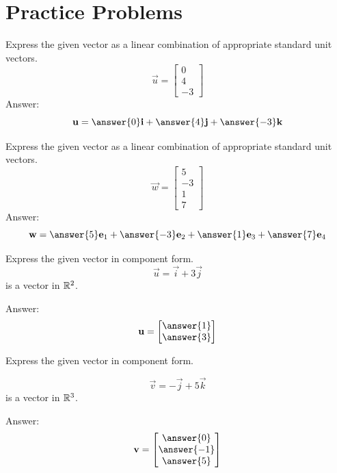 \documentclass{ximera}
\begin{document}
\section*{Practice Problems}
\begin{problem}\label{prob:lincombijk1a}
  Express the given vector as a linear combination of appropriate standard unit vectors.
  $$\vec{u}=\begin{bmatrix}
0\\
4\\
-3
\end{bmatrix}$$
Answer:
$$\vec{u}=\answer{0}\vec{i}+\answer{4}\vec{j}+\answer{-3}\vec{k}$$
\end{problem}

\begin{problem}\label{prob:lincombijk1c}
Express the given vector as a linear combination of appropriate standard unit vectors.
$$\vec{w}=\begin{bmatrix}
5\\
-3\\
1\\
7
\end{bmatrix}$$
Answer:
$$\vec{w}=\answer{5}\vec{e}_1+\answer{-3}\vec{e}_2+\answer{1}\vec{e}_3+\answer{7}\vec{e}_4$$
  \end{problem}



  \begin{problem}\label{prob:lincombijk2a}
  Express the given vector in component form.
  $$\vec{u}=\vec{i}+3\vec{j}$$ is a vector in $\mathbb{R}^2$.
  
  Answer:
  $$\vec{u}=\begin{bmatrix}\answer{1}\\\answer{3}\end{bmatrix}$$
  \end{problem}
  
  \begin{problem}\label{prob:lincombijk2b}
   Express the given vector in component form.
   
  $$\vec{v}=-\vec{j}+5\vec{k}$$ is a vector in $\mathbb{R}^3$.
  
  Answer:
  $$\vec{v}=\begin{bmatrix}\answer{0}\\\answer{-1}\\\answer{5}\end{bmatrix}$$
  \end{problem}
  
\end{document}
